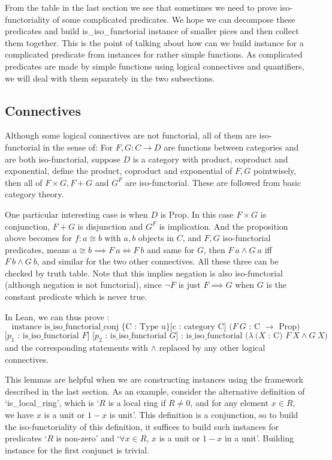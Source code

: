 \documentclass[11pt]{article}
\begin{document}
From the table in the last section we see that sometimes we need to prove iso-functoriality of some complicated predicates. We hope we can decompose these predicates and build is\_iso\_functorial instance of smaller pices and then collect them together. This is the point of talking about how can we build instance for a complicated predicate from instances for rather simple functions. As complicated predicates are made by simple functions using logical connectives and quantifiers, we will deal with them separately in the two subsections.

\subsection{Connectives}

Although some logical connectives are not functorial, all of them are iso-functorial in the sense of: For $F,G: C\to D$ are functions between categories and are both iso-functorial, suppose $D$ is a category with product, coproduct and exponential, define the product, coproduct and exponential of $F,G$ pointwisely, then all of $F\times G,F+G$ and $G^F$ are iso-functorial. These are followed from basic category theory. 

One particular interesting case is when $D$ is Prop. In this case $F\times G$ is conjunction, $F+G$ is disjunction and $G^F$ is implication. And the proposition above becomes for $f: a\cong b$ with $a,b$ objects in $C$, and $F,G$ iso-functorial predicates, means $a \cong b\implies F \ a \Leftrightarrow F \ b$ and same for $G$, then $F \ a \land G \ a$ iff $F \ b \land G \ b$, and similar for the two other connectives. All these three can be checked by truth table. Note that this implies negation is also iso-functorial (although negation is not functorial), since $\lnot F$ is just $F\implies G$ when $G$ is the constant predicate which is never true.

In Lean, we can thus prove :
\[\text{instance is\_iso\_functorial\_conj \{C : Type u\} [c : category C] ($F \ G$ : C $\to$ Prop)}\]
\[\text{
[$p_1$ : is\_iso\_functorial $F$] [$p_2$ : is\_iso\_functorial $G$]
: is\_iso\_functorial ($\lambda \ (X$ : C) $F \ X\land   G \ X$)}\]
and the corresponding statements with $\land$ replaced by any other logical connectives. 

This lemmas are helpful when we are constructing instances using the framework described in the last section. As an example, consider the alternative definition of `is\_local\_ring', which is `$R$ is a local ring if $R\ne 0$, and for any element $x\in R$, we have $x$ is a unit or $1-x$ is unit'. This definition is a conjunction, so to build the iso-functoriality of this definition, it suffices to build such instances for predicates `$R$ is non-zero' and `$\forall x\in R$, $x$ is a unit or $1-x$ in a unit'. Building instance for the first conjunct is trivial.
\end{document}
